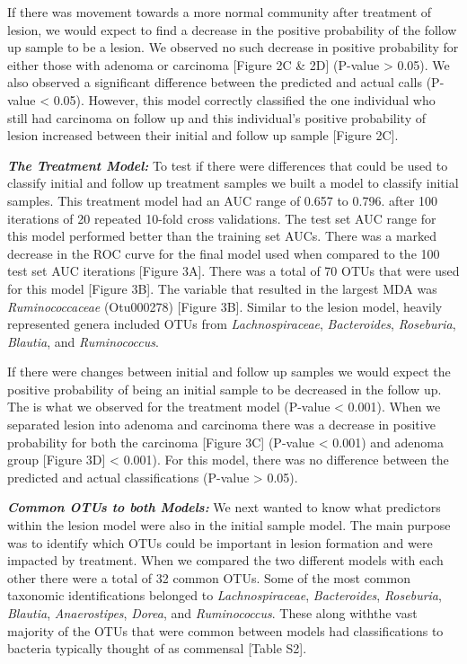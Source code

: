 \documentclass[12pt,]{article}
\begin{document}
If there was movement towards a more normal community after treatment of
lesion, we would expect to find a decrease in the positive probability
of the follow up sample to be a lesion. We observed no such decrease in
positive probability for either those with adenoma or carcinoma
{[}Figure 2C \& 2D{]} (P-value \textgreater{} 0.05). We also observed a
significant difference between the predicted and actual calls (P-value
\textless{} 0.05). However, this model correctly classified the one
individual who still had carcinoma on follow up and this individual's
positive probability of lesion increased between their initial and
follow up sample {[}Figure 2C{]}.

\textbf{\emph{The Treatment Model:}} To test if there were differences
that could be used to classify initial and follow up treatment samples
we built a model to classify initial samples. This treatment model had
an AUC range of 0.657 to 0.796. after 100 iterations of 20 repeated
10-fold cross validations. The test set AUC range for this model
performed better than the training set AUCs. There was a marked decrease
in the ROC curve for the final model used when compared to the 100 test
set AUC iterations {[}Figure 3A{]}. There was a total of 70 OTUs that
were used for this model {[}Figure 3B{]}. The variable that resulted in
the largest MDA was \emph{Ruminococcaceae} (Otu000278) {[}Figure 3B{]}.
Similar to the lesion model, heavily represented genera included OTUs
from \emph{Lachnospiraceae}, \emph{Bacteroides}, \emph{Roseburia},
\emph{Blautia}, and \emph{Ruminococcus}.

If there were changes between initial and follow up samples we would
expect the positive probability of being an initial sample to be
decreased in the follow up. The is what we observed for the treatment
model (P-value \textless{} 0.001). When we separated lesion into adenoma
and carcinoma there was a decrease in positive probability for both the
carcinoma {[}Figure 3C{]} (P-value \textless{} 0.001) and adenoma group
{[}Figure 3D{]} \textless{} 0.001). For this model, there was no
difference between the predicted and actual classifications (P-value
\textgreater{} 0.05).

\textbf{\emph{Common OTUs to both Models:}} We next wanted to know what
predictors within the lesion model were also in the initial sample
model. The main purpose was to identify which OTUs could be important in
lesion formation and were impacted by treatment. When we compared the
two different models with each other there were a total of 32 common
OTUs. Some of the most common taxonomic identifications belonged to
\emph{Lachnospiraceae}, \emph{Bacteroides}, \emph{Roseburia},
\emph{Blautia}, \emph{Anaerostipes}, \emph{Dorea}, and
\emph{Ruminococcus}. These along withthe vast majority of the OTUs that
were common between models had classifications to bacteria typically
thought of as commensal {[}Table S2{]}.
\end{document}
